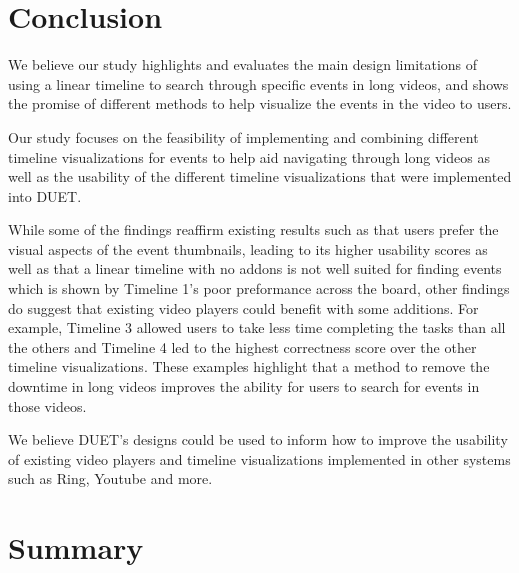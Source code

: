 \documentclass[doublespace,draft,nopageskip]{VTthesis} %
\begin{document}
	\chapter{Conclusion} \label{ch:conclusions}

We believe our study highlights and evaluates the main design limitations of using a linear timeline to search through specific events in long videos, and shows the promise of different methods to help visualize the events in the video to users. 

Our study focuses on the feasibility of implementing and combining different timeline visualizations for events to help aid navigating through long videos as well as the usability of the different timeline visualizations that were implemented into DUET. 

While some of the findings reaffirm existing results such as that users prefer the visual aspects of the event thumbnails, leading to its higher usability scores as well as that a linear timeline with no addons is not well suited for finding events which is shown by Timeline 1's poor preformance across the board, other findings do suggest that existing video players could benefit with some additions. For example, Timeline 3 allowed users to take less time completing the tasks than all the others and Timeline 4 led to the highest correctness score over the other timeline visualizations. These examples highlight that a method to remove the downtime in long videos improves the ability for users to search for events in those videos.

We believe DUET’s designs could be used to inform how to improve the usability of existing video players and timeline visualizations implemented in other systems such as Ring, Youtube and more.
	\chapter{Summary} \label{ch:summary}


	\appendix
\end{document}
